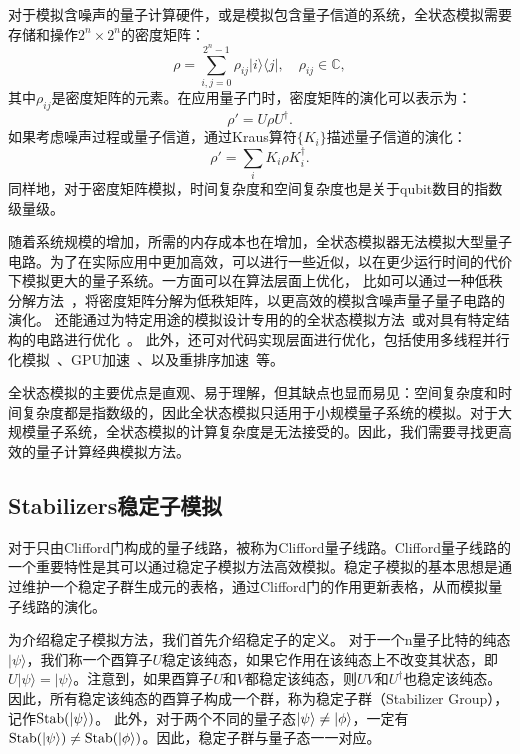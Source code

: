 对于模拟含噪声的量子计算硬件，或是模拟包含量子信道的系统，全状态模拟需要存储和操作$2^n \times 2^n$的密度矩阵：
\begin{equation}
    \rho = \sum_{i,j=0}^{2^n-1} \rho_{ij} |i\rangle\langle j|,
    \quad \rho_{ij} \in \mathbb{C},
\end{equation}
其中$\rho_{ij}$是密度矩阵的元素。在应用量子门时，密度矩阵的演化可以表示为：
\begin{equation}
    \rho' = U \rho U^\dagger.
\end{equation}
如果考虑噪声过程或量子信道，通过Kraus算符$\{K_i\}$描述量子信道的演化：
\begin{equation}
    \rho' = \sum_i K_i \rho K_i^\dagger.
\end{equation}
同样地，对于密度矩阵模拟，时间复杂度和空间复杂度也是关于qubit数目的指数级量级。



随着系统规模的增加，所需的内存成本也在增加，全状态模拟器无法模拟大型量子电路。为了在实际应用中更加高效，可以进行一些近似，以在更少运行时间的代价下模拟更大的量子系统。一方面可以在算法层面上优化，
比如可以通过一种低秩分解方法~\cite{chen2021low}，将密度矩阵分解为低秩矩阵，以更高效的模拟含噪声量子量子电路的演化。
还能通过为特定用途的模拟设计专用的的全状态模拟方法~\cite{jones2020efficient,kassal2008polynomial}或对具有特定结构的电路进行优化~\cite{bravyi2016improved,vidal2003efficient}。
此外，还可对代码实现层面进行优化，包括使用多线程并行化模拟~\cite{de2019massively}、GPU加速~\cite{amariutei2011parallel}、以及重排序加速~\cite{fatima2021faster}等。


全状态模拟的主要优点是直观、易于理解，但其缺点也显而易见：空间复杂度和时间复杂度都是指数级的，因此全状态模拟只适用于小规模量子系统的模拟。对于大规模量子系统，全状态模拟的计算复杂度是无法接受的。因此，我们需要寻找更高效的量子计算经典模拟方法。

\subsection{Stabilizers稳定子模拟}

对于只由Clifford门构成的量子线路，被称为Clifford量子线路。Clifford量子线路的一个重要特性是其可以通过稳定子模拟方法高效模拟。稳定子模拟的基本思想是通过维护一个稳定子群生成元的表格，通过Clifford门的作用更新表格，从而模拟量子线路的演化。

为介绍稳定子模拟方法，我们首先介绍稳定子的定义。
对于一个n量子比特的纯态$|\psi\rangle$，我们称一个酉算子$U$稳定该纯态，如果它作用在该纯态上不改变其状态，即$U|\psi\rangle = |\psi\rangle$。注意到，如果酉算子$U$和$V$都稳定该纯态，则$UV$和$U^\dagger$也稳定该纯态。因此，所有稳定该纯态的酉算子构成一个群，称为稳定子群（Stabilizer Group），记作$\text{Stab}(\ket{\psi})$。
此外，对于两个不同的量子态$\ket{\psi}\neq\ket{\phi}$，一定有$\text{Stab}(\ket{\psi})\neq\text{Stab}(\ket{\phi})$。因此，稳定子群与量子态一一对应。

